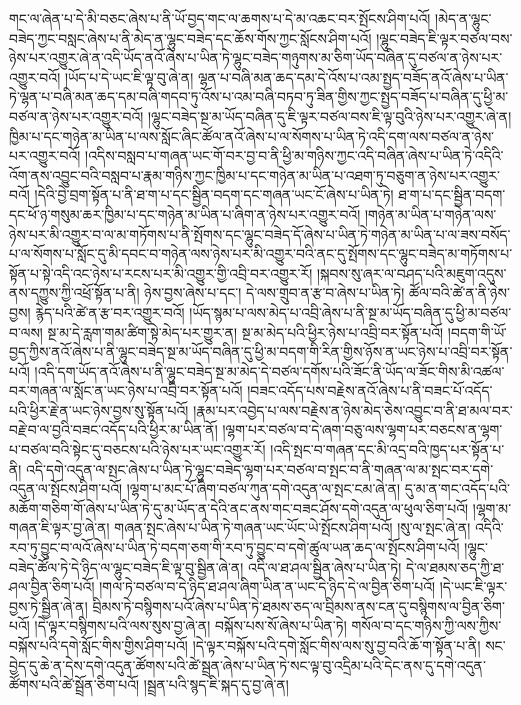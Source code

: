 གང་ལ་ཞེན་པ་དེ་མི་བཅང་ཞེས་པ་ནི་ཡོ་བྱད་གང་ལ་ཆགས་པ་དེ་མ་འཆང་བར་སྤོངས་ཤིག་པའོ། །མེད་ན་ལྷུང་བཟེད་ཀྱང་བསླང་ཞེས་པ་ནི་མེད་ན་ལྷུང་བཟེད་དང་ཆོས་གོས་ཀྱང་སློངས་ཤིག་པའོ། །ལྷུང་བཟེད་ཇི་ལྟར་བཙལ་བས་ཉེས་པར་འགྱུར་ཞེ་ན་འདི་ཡོད་ནའོ་ཞེས་པ་ཡིན་ཏེ་ལྷུང་བཟེད་གཉུགས་མ་ཅིག་ཡོད་བཞིན་དུ་བཙལ་ན་ཉེས་པར་འགྱུར་བའོ། །ཡོད་པ་དེ་ཡང་ཇི་ལྟ་བུ་ཞེ་ན། ལྷན་པ་བཞི་མན་ཆད་དམ་དེ་འོས་པ་འམ་སྤྱད་བཟོད་ནའོ་ཞེས་པ་ཡིན་ཏེ་ལྷན་པ་བཞི་མན་ཆད་དམ་བཞི་གདབ་ཏུ་འོས་པ་འམ་བཞི་བཏབ་ཏུ་ཟིན་གྱིས་ཀྱང་སྤྱད་བཟོད་པ་བཞིན་དུ་ཕྱི་མ་བཙལ་ན་ཉེས་པར་འགྱུར་བའོ། །ལྷུང་བཟེད་སྔ་མ་ཡོད་བཞིན་དུ་ཇི་ལྟར་བཙལ་བས་ཇི་ལྟ་བུའི་ཉེས་པར་འགྱུར་ཞེ་ན། ཁྱིམ་པ་དང་གཉེན་མ་ཡིན་པ་ལས་སློང་ཞིང་ཚོལ་ནའོ་ཞེས་པ་ལ་སོགས་པ་ཡིན་ཏེ་འདི་དག་ལས་བཙལ་ན་ཉེས་པར་འགྱུར་བའོ། །འདིས་བསླབ་པ་གཞན་ཡང་གོ་བར་བྱ་བ་ནི་ཕྱི་མ་གཉིས་ཀྱང་འདི་བཞིན་ཞེས་པ་ཡིན་ཏེ་འདིའི་འོག་ནས་འབྱུང་བའི་བསླབ་པ་རྣམ་གཉིས་ཀྱང་ཁྱིམ་པ་དང་གཉེན་མ་ཡིན་པ་འཐག་ཏུ་བཅུག་ན་ཉེས་པར་འགྱུར་བའོ། །དེའི་བྱེ་བྲག་སྟོན་པ་ནི་ཐ་ག་པ་དང་སྦྱིན་བདག་དང་གཞན་ཡང་ངོ་ཞེས་པ་ཡིན་ཏེ། ཐ་ག་པ་དང་སྦྱིན་བདག་དང་ཕོ་ཉ་གསུམ་ཆར་ཁྱིམ་པ་དང་གཉེན་མ་ཡིན་པ་ཞིག་ན་ཉེས་པར་འགྱུར་བའོ། །གཉེན་མ་ཡིན་པ་གཉེན་ལས་ཉེས་པར་མི་འགྱུར་བ་ལ་མ་གཏོགས་པ་ནི་སྤོགས་དང་ལྷུང་བཟེད་དོ་ཞེས་པ་ཡིན་ཏེ་གཉེན་མ་ཡིན་པ་ལ་ཟས་བསོད་པ་ལ་སོགས་པ་སློང་དུ་མི་དབང་བ་གཉེན་ལས་ཉེས་པར་མི་འགྱུར་བའི་ནང་དུ་སྤོགས་དང་ལྷུང་བཟེད་མ་གཏོགས་པ་སྟོན་པ་སྟེ་འདི་འང་ཉེས་པ་རངས་པར་མི་འགྱུར་གྱི་འབྲི་བར་འགྱུར་རོ། །སྐབས་སུ་ཞར་ལ་བཤད་པའི་མཇུག་འདུས་ནས་དཀྱུས་ཀྱི་འཕྲོ་སྟོན་པ་ནི། ཉེས་བྱས་ཞེས་པ་དང་། དེ་ལས་གྲུབ་ན་རྩ་བ་ཞེས་པ་ཡིན་ཏེ། ཚོལ་བའི་ཚེ་ན་ནི་ཉེས་བྱས། རྙེད་པའི་ཚེ་ན་རྩ་བར་འགྱུར་བའོ། །ཡོད་སྙམ་པ་ལས་མེད་པ་འབྲི་ཞེས་པ་ནི་སྔ་མ་ཡོད་བཞིན་དུ་ཕྱི་མ་བཙལ་བ་ལས། སྔ་མ་དེ་རླག་གམ་ཚིག་སྟེ་མེད་པར་གྱུར་ན། སྔ་མ་མེད་པའི་ཕྱིར་ཉེས་པ་འབྲི་བར་སྟོན་པའོ། །བདག་གི་ཡོ་བྱད་ཀྱིས་ནའོ་ཞེས་པ་ནི་ལྷུང་བཟེད་སྔ་མ་ཡོད་བཞིན་དུ་ཕྱི་མ་བདག་གི་རིན་གྱིས་ཉོས་ན་ཡང་ཉེས་པ་འབྲི་བར་སྟོན་པའོ། །འདི་དག་ཡོད་ནའོ་ཞེས་པ་ནི་ལྷུང་བཟེད་སྔ་མ་མེད་དེ་བཙལ་དགོས་པའི་ཟོང་ནི་ཡོད་ལ་ཟོང་གིས་མི་འཚལ་བར་གཞན་ལ་སློང་ན་ཡང་ཉེས་པ་འབྲི་བར་སྟོན་པའོ། །བཟང་འདོད་པས་བརྗེས་ནའོ་ཞེས་པ་ནི་བཟང་པོ་འདོད་པའི་ཕྱིར་རྗེ་ན་ཡང་ཉེས་བྱས་སུ་སྟོན་པའོ། །རྣམ་པར་འབྱེད་པ་ལས་བརྗེས་ན་ཉེས་མེད་ཅེས་འབྱུང་བ་ནི་ཐ་མལ་བར་བརྗེ་བ་ལ་བྱའི་བཟང་འདོད་པའི་ཕྱིར་མ་ཡིན་ནོ། །ལྷག་པར་བཙལ་བ་དེ་ཞག་བཅུ་ལས་ལྷག་པར་བཅངས་ན་ལྷག་པ་བཙལ་བའི་སྟེང་དུ་བཅངས་པའི་ཉེས་པར་ཡང་འགྱུར་རོ། །འདི་སྤང་བ་གཞན་དང་མི་འདྲ་བའི་ཁྱད་པར་སྟོན་པ་ནི། འདི་དགེ་འདུན་ལ་སྤང་ཞེས་པ་ཡིན་ཏེ་ལྷུང་བཟེད་ལྷག་པར་བཙལ་བ་སྤང་བ་ནི་གཞན་ལ་མ་སྤང་བར་དགེ་འདུན་ལ་སྤོངས་ཤིག་པའོ། །ལྷག་པ་མང་པོ་ཞིག་བཙལ་ཀུན་དགེ་འདུན་ལ་སྤང་ངམ་ཞེ་ན། དུ་མ་ན་གང་འདོད་པའི་མཆོག་གཅིག་གོ་ཞེས་པ་ཡིན་ཏེ་དུ་མ་ཡོད་ན་དེའི་ནང་ནས་གང་བཟང་ཤོས་དགེ་འདུན་ལ་ཕུལ་ཅིག་པའོ། །ལྷག་མ་གཞན་ཇི་ལྟར་བྱ་ཞེ་ན། གཞན་སྤང་ཞེས་པ་ཡིན་ཏེ་གཞན་ཡང་ཡོང་ཡེ་སྤོངས་ཤིག་པའོ། །སུ་ལ་སྤང་ཞེ་ན། འདིའི་རབ་ཏུ་བྱུང་བ་ལའོ་ཞེས་པ་ཡིན་ཏེ་བདག་ཅག་གི་རབ་ཏུ་བྱུང་བ་དགེ་ཚུལ་ཡན་ཆད་ལ་སྤོངས་ཤིག་པའོ། །ལྷུང་བཟེད་ཚོལ་ཏེ་དེ་ཉིད་ལ་ལྷུང་བཟེད་ཇི་ལྟ་བུ་སྦྱིན་ཞེ་ན། འདི་ལ་ཐ་ཤལ་སྦྱིན་ཞེས་པ་ཡིན་ཏེ། དེ་ལ་ཐམས་ཅད་ཀྱི་ཐ་ཤལ་བྱིན་ཅིག་པའོ། །གལ་ཏེ་བཙལ་བ་དེ་ཉིད་ཐ་ཤལ་ཞིག་ཡིན་ན་ཡང་དེ་ཉིད་དེ་ལ་བྱིན་ཅིག་པའོ། །དེ་ཡང་ཇི་ལྟར་བྱས་ཏེ་སྦྱིན་ཞེ་ན། བྲིམས་ཏེ་བསྙིགས་པའོ་ཞེས་པ་ཡིན་ཏེ་ཐམས་ཅད་ལ་བྲིམས་ནས་ངན་དུ་བསྙིགས་ལ་བྱིན་ཅིག་པའོ། །དེ་ལྟར་བསྙིགས་པའི་ལས་སུས་བྱ་ཞེ་ན། བསྐོས་པས་སོ་ཞེས་པ་ཡིན་ཏེ། གསོལ་བ་དང་གཉིས་ཀྱི་ལས་ཀྱིས་བསྐོས་པའི་དགེ་སློང་གིས་གྱིས་ཤིག་པའོ། །དེ་ལྟར་བསྐོས་པའི་དགེ་སློང་གིས་ལས་སུ་བྱ་བའི་ཆོ་ག་སྟོན་པ་ནི། སང་བྱེད་དུ་ཆེ་ན་དེས་དགེ་འདུན་ཚོགས་པའི་ཚེ་སྦྲན་ཞེས་པ་ཡིན་ཏེ་སང་ལྟ་བུ་འདྲིམ་པའི་དེང་ནས་དུ་དགེ་འདུན་ཚོགས་པའི་ཚེ་སྦྲོན་ཅིག་པའོ། །སྦྲན་པའི་སྙད་ཇི་སྐད་དུ་བྱ་ཞེ་ན། 